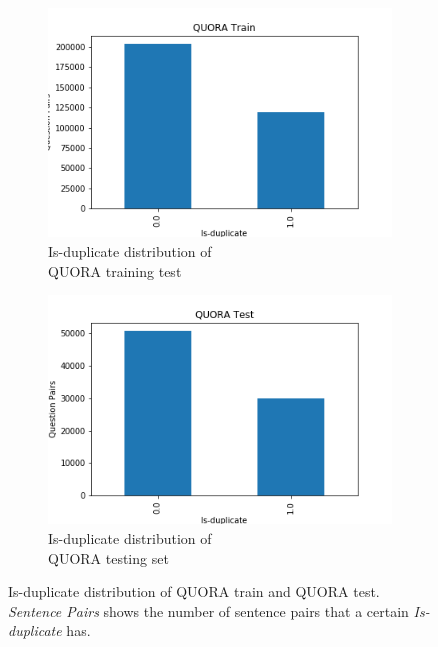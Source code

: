 \begin{enumerate}
\begin{figure}
	\captionsetup[subfigure]{justification=centering}
	\centering
	\begin{subfigure}[b]{.5\textwidth}
		\centering
		\includegraphics[width=\textwidth]{figures/semantic_textual_similarity/introduction/quora_train.png}
		\caption{Is-duplicate distribution of \\ QUORA training test}
		\label{fig:quora_train_is_duplicate}
	\end{subfigure}%
	\begin{subfigure}[b]{.5\textwidth}
		\centering
		\includegraphics[width=\textwidth]{figures/semantic_textual_similarity/introduction/quora_test.png}
		\caption{Is-duplicate distribution of \\ QUORA testing set}
		\label{fig:quora_test_is_duplicate}
	\end{subfigure}
	\caption[Is-duplicate distribution of QUORA train and QUORA test]{Is-duplicate distribution of QUORA train and QUORA test. \textit{Sentence Pairs} shows the number of sentence pairs that a certain \textit{Is-duplicate} has.}
	\label{fig:quora_is_duplicate}
\end{figure}



\end{enumerate}
